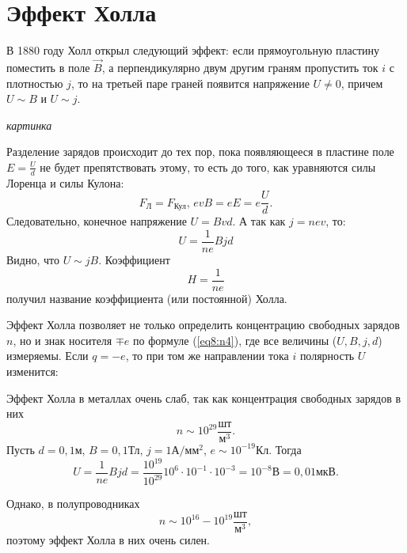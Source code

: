 \section{Эффект Холла}
    
    В 1880 году Холл открыл следующий эффект: если прямоугольную пластину
    поместить в поле \( \vec{B} \), а перпендикулярно двум другим граням
    пропустить ток \( i \) с плотностью \( j \), то на третьей паре граней
    появится напряжение \( U \ne 0 \), причем \( U \sim B \) и \( U \sim j \).
    
    \textit{картинка} %
    
    Разделение зарядов происходит до тех пор, пока появляющееся в пластине поле
    \( E = \frac{U}{d} \) не будет препятствовать этому, то есть до того, как
    уравняются силы Лоренца и силы Кулона:
    \[
        F_{\textit{Л}} = F_{\textit{Кул}}, \, evB = eE = e\frac{U}{d}.
    \]
    Следовательно, конечное напряжение \( U = Bvd \). А так как \( j = nev \),
    то:
    \begin{equation}
        U = \frac{1}{ne}Bjd
        \label{eq8:n4}
    \end{equation}
    Видно, что \( U \sim jB \). Коэффициент
    \[
        H = \frac{1}{ne}
    \]
    получил название коэффициента (или постоянной) Холла.
    
    Эффект Холла позволяет не только определить концентрацию свободных зарядов
    \( n \), но и знак носителя \( \mp e \) по формуле (\ref{eq8:n4}), где все
    величины (\( U, B, j, d \)) измеряемы. Если \( q = -e \), то при том же
    направлении тока \( i \) полярность \( U \) изменится: 

    \begin{remark}
        Эффект Холла в металлах очень слаб, так как концентрация свободных
        зарядов в них
        \[
            n \sim 10^{29} \frac{\text{шт}}{\text{м}^3}.
        \]
        Пусть \( d = 0,1 \)м, \( B = 0,1 \)Тл, \( j = 1 \text{А}/\text{мм}^2 \),
        \( e \sim 10^{-19} \)Кл. Тогда
        \[
            U = \frac{1}{ne}Bjd =
            \frac{10^{19}}{10^{29}}10^6 \cdot 10^{-1} \cdot 10^{-3} =
            10^{-8} \text{В} = 0,01 \text{мкВ}.
        \]
    
        Однако, в полупроводниках
        \[
            n \sim 10^{16}-10^{19} \frac{\text{шт}}{\text{м}^3},
        \]
        поэтому эффект Холла в них очень силен.
    \end{remark}
